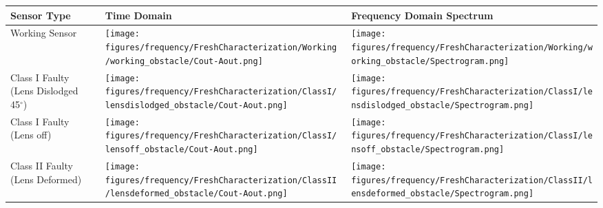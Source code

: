 \begin{table*}[htb]
  \centering
    \begin{tabular}{| p{2cm}| m{7cm} | m{7cm} | }
        \hline
        \bfseries Sensor Type & 
        \bfseries Time Domain &  
        \bfseries Frequency Domain Spectrum \\ \hline 
        
        \hline
        Working Sensor &         
        \begin{minipage}{.35\textwidth}
        \texttt{[image: figures/frequency/FreshCharacterization/Working/working\_obstacle/Cout-Aout.png]}
        \end{minipage} & 
        \begin{minipage}{.35\textwidth}
        \texttt{[image: figures/frequency/FreshCharacterization/Working/working\_obstacle/Spectrogram.png]}
        \end{minipage} \\ 
        
        \hline
        Class I Faulty (Lens Dislodged ~ 45$^{\circ}$) &         
        \begin{minipage}{.35\textwidth}
        \texttt{[image: figures/frequency/FreshCharacterization/ClassI/lensdislodged\_obstacle/Cout-Aout.png]}
        \end{minipage} & 
        \begin{minipage}{.35\textwidth}
        \texttt{[image: figures/frequency/FreshCharacterization/ClassI/lensdislodged\_obstacle/Spectrogram.png]}
        \end{minipage} \\ 

        \hline
        Class I Faulty (Lens off) &         
        \begin{minipage}{.35\textwidth}
        \texttt{[image: figures/frequency/FreshCharacterization/ClassI/lensoff\_obstacle/Cout-Aout.png]}
        \end{minipage} & 
        \begin{minipage}{.35\textwidth}
        \texttt{[image: figures/frequency/FreshCharacterization/ClassI/lensoff\_obstacle/Spectrogram.png]}
        \end{minipage} \\        
        
        \hline
        Class II Faulty (Lens Deformed) &         
        \begin{minipage}{.35\textwidth}
        \texttt{[image: figures/frequency/FreshCharacterization/ClassII/lensdeformed\_obstacle/Cout-Aout.png]}
        \end{minipage} & 
        \begin{minipage}{.35\textwidth}
        \texttt{[image: figures/frequency/FreshCharacterization/ClassII/lensdeformed\_obstacle/Spectrogram.png]}
        \end{minipage} \\            
        

\end{tabular}
\end{table*}
